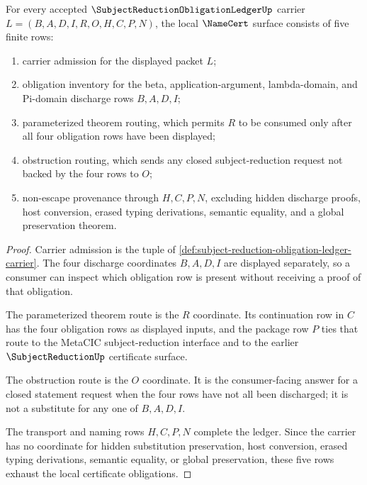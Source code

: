 \begin{theorem}
\label{thm:subject-reduction-obligation-ledger-namecert-obligations}
For every accepted $\SubjectReductionObligationLedgerUp$ carrier $L=(B,A,D,I,R,O,H,C,P,N)$, the local $\NameCert$ surface consists of five finite rows:
\begin{enumerate}
\item carrier admission for the displayed packet $L$;
\item obligation inventory for the beta, application-argument, lambda-domain, and Pi-domain discharge rows $B,A,D,I$;
\item parameterized theorem routing, which permits $R$ to be consumed only after all four obligation rows have been displayed;
\item obstruction routing, which sends any closed subject-reduction request not backed by the four rows to $O$;
\item non-escape provenance through $H,C,P,N$, excluding hidden discharge proofs, host conversion, erased typing derivations, semantic equality, and a global preservation theorem.
\end{enumerate}
\end{theorem}
\begin{proof}
Carrier admission is the tuple of \autoref{def:subject-reduction-obligation-ledger-carrier}. The four discharge coordinates $B,A,D,I$ are displayed separately, so a consumer can inspect which obligation row is present without receiving a proof of that obligation.

The parameterized theorem route is the $R$ coordinate. Its continuation row in $C$ has the four obligation rows as displayed inputs, and the package row $P$ ties that route to the MetaCIC subject-reduction interface and to the earlier $\SubjectReductionUp$ certificate surface.

The obstruction route is the $O$ coordinate. It is the consumer-facing answer for a closed statement request when the four rows have not all been discharged; it is not a substitute for any one of $B,A,D,I$.

The transport and naming rows $H,C,P,N$ complete the ledger. Since the carrier has no coordinate for hidden substitution preservation, host conversion, erased typing derivations, semantic equality, or global preservation, these five rows exhaust the local certificate obligations.
\end{proof}

